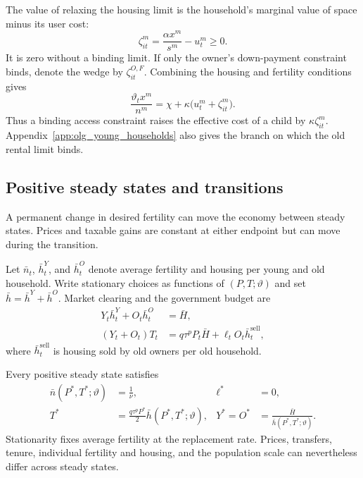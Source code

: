The value of relaxing the housing limit is the household's marginal value of
space minus its user cost:
\begin{equation}
 \zeta_{it}^m=
 \frac{\alpha x^m}{s^m}-u_t^m\geq0.
 \label{eq:olg_access_wedge}
\end{equation}
It is zero without a binding limit.  If only the owner's down-payment constraint
binds, denote the wedge by $\zeta_{it}^{O,F}$.
Combining the housing and fertility conditions gives
\begin{equation}
 \frac{\vartheta_t x^m}{n^m}
 =\chi+\kappa\bigl(u_t^m+\zeta_{it}^m\bigr).
 \label{eq:olg_full_price_child}
\end{equation}
Thus a binding access constraint raises the effective cost of a child by
$\kappa\zeta_{it}^m$.  Appendix~\ref{app:olg_young_households} also gives the
branch on which the old rental limit binds.

\subsection{Positive steady states and transitions}

A permanent change in desired fertility can move the economy between steady
states.  Prices and taxable gains are constant at either endpoint but can move
during the transition.

Let $\bar n_t$, $\bar h_t^Y$, and $\bar h_t^O$ denote average fertility and
housing per young and old household.  Write stationary choices as functions of
$(P,T;\vartheta)$ and set $\bar h=\bar h^Y+\bar h^O$.  Market clearing and the
government budget are
\begin{align}
 Y_t\bar h_t^Y+O_t\bar h_t^O&=\bar H,
 \label{eq:olg_housing_clearing}\\
 (Y_t+O_t)T_t&=q\tau^pP_t\bar H+\ell_tO_t\bar h_t^{\mathrm{sell}},
 \label{eq:olg_government}
\end{align}
where $\bar h_t^{\mathrm{sell}}$ is housing sold by old owners per old
household.

\begin{proposition}
\label{prop:olg_steady_state}
Every positive steady state satisfies
\begin{align}
 \bar n(P^*,T^*;\vartheta)&=\frac{1}{\nu},
 &\ell^*&=0,\\
 T^*&=\frac{q\tau^pP^*}{2}\bar h(P^*,T^*;\vartheta),
 &Y^*=O^*&=\frac{\bar H}{\bar h(P^*,T^*;\vartheta)}.
 \label{eq:olg_steady_state_system}
\end{align}
Stationarity fixes average fertility at the replacement rate.  Prices,
transfers, tenure, individual fertility and housing, and the population scale
can nevertheless differ across steady states.
\end{proposition}


